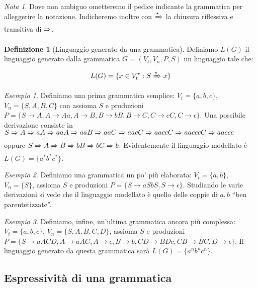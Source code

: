\documentclass[a4paper,11pt,twoside]{article}
\theoremstyle{plain}
\theoremstyle{definition}
\newtheorem{defn}{Definizione}[section]
\theoremstyle{remark}
\newtheorem{esempio}{Esempio}[section]
\newtheorem*{nota}{Nota}
\newcommand*{\deriv}[1][]{\xRightarrow[#1]{}}
\newcommand*{\derivstar}[1][]{\xRightarrow[#1]{\star}}
\begin{document}
\begin{nota}
  Dove non ambiguo ometteremo il pedice indicante la grammatica per alleggerire
  la notazione. Indicheremo inoltre con $\derivstar$ la chiusura riflessiva
  e transitiva di $\deriv$.
\end{nota}

\begin{defn}[Linguaggio generato da una grammatica]\label{def:ling-gen-grammatica}
  Definiamo $L(G)$ il linguaggio generato dalla grammatica
  $G = (V_t, V_n, P, S)$ un linguaggio tale che:

  \begin{equation}
    L(G) = \{ x \in V_t^\star : S \derivstar x \}
  \end{equation}
\end{defn}

\begin{esempio}
  Definiamo una prima grammatica semplice: $V_t = \{a,b,c\}$, $V_n =
  \{S,A,B,C\}$ con assioma $S$ e produzioni $P = \{S \to A, A \to Aa, A \to B,
  B \to bB, B \to C, C \to cC, C \to \epsilon \}$. Una possibile derivazione
  consiste in $S \deriv A \deriv aA \deriv aaA \deriv aaB \deriv aaC \deriv aacC
  \deriv aaccC \deriv aacccC \deriv aaccc$ oppure $S \deriv A \deriv B \deriv bB
  \deriv bC \deriv b$. Evidentemente il linguaggio modellato è $L(G) =
  \{a^*b^*c^*\}$.
\end{esempio}

\begin{esempio}
  Definiamo una grammatica un po' più elaborata: $V_t = \{a,b\}$, $V_n = \{S\}$,
  assioma $S$ e produzioni $P = \{S \to aSbS, S \to \epsilon\}$. Studiando le
  varie derivazioni si vede che il linguaggio modellato è quello delle coppie di
  $a,b$ ``ben parentetizzate''.
\end{esempio}

\begin{esempio}
  Definiamo, infine, un'ultima grammatica ancora più complessa: $V_t =
  \{a,b,c\}$, $V_n = \{S,A,B,C,D\}$, assioma $S$ e produzioni
  $P = \{S \to aACD, A \to aAC, A \to \epsilon, B \to b, CD \to BDc, CB \to BC,
  D \to \epsilon\}$. Il linguaggio generato da questa grammatica sarà $L(G) =
  \{a^n b^n c^n \}$.
\end{esempio}

\subsection{Espressività di una grammatica}\label{sec:espressivita-grammatica}
\end{document}
